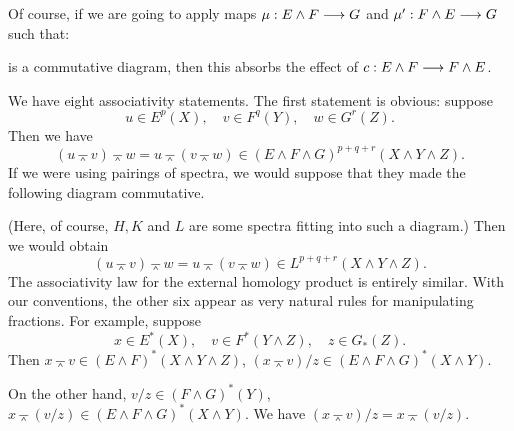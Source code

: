 \documentclass[../main]{subfiles}
\begin{document}
Of course, if we are going to apply maps \(\mu : E \wedge F \overset{}{\longrightarrow} G\) and \(\mu' : F \wedge E \overset{}{\longrightarrow} G\) such that: 

\begin{center}
\end{center}

is a commutative diagram, then this absorbs the effect of \(c : E \wedge F \overset{}{\longrightarrow} F \wedge E\). 

We have eight associativity statements. The first statement is obvious: suppose $$u \in E^p(X), \quad v \in F^q(Y), \quad w \in G^r(Z).$$ Then we have $$(u \barwedge v) \barwedge w = u \barwedge (v \barwedge w) \in (E \wedge F \wedge G)^{p + q + r}(X \wedge Y \wedge Z).$$ If we were using pairings of spectra, we would suppose that they made the following diagram commutative. 

\begin{center}
\end{center}

(Here, of course, $H, K$ and $L$ are some spectra fitting into such a diagram.) Then we would obtain $$(u \barwedge v) \barwedge w = u \barwedge (v \barwedge w) \in L^{p + q + r}(X \wedge Y \wedge Z).$$ The associativity law for the external homology product is entirely similar. With our conventions, the other six appear as very natural rules for manipulating fractions. For example, suppose $$x \in E^\ast(X), \quad v \in F^\ast(Y \wedge Z), \quad z \in G_\ast(Z).$$ Then $x \barwedge v \in (E \wedge F)^\ast(X \wedge Y \wedge Z)$, $(x \barwedge v)/z \in (E \wedge F \wedge G)^\ast(X \wedge Y)$. 

On the other hand, $v/z \in (F \wedge G)^\ast(Y)$, $x \barwedge (v/z) \in (E \wedge F \wedge G)^\ast(X \wedge Y)$. We have $(x \barwedge v)/z = x \barwedge (v/z)$.
\end{document}
